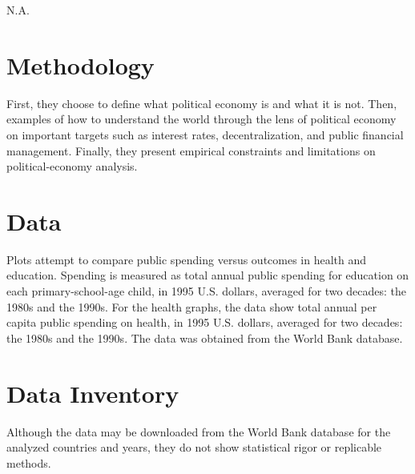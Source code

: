 \documentclass[9pt,twocolumn,twoside,]{pnas-new}
\begin{document}
N.A.

\hypertarget{methodology}{%
\section*{Methodology}\label{methodology}}

First, they choose to define what political economy is and what it is
not. Then, examples of how to understand the world through the lens of
political economy on important targets such as interest rates,
decentralization, and public financial management. Finally, they present
empirical constraints and limitations on political-economy analysis.

\hypertarget{data}{%
\section*{Data}\label{data}}

Plots attempt to compare public spending versus outcomes in health and
education. Spending is measured as total annual public spending for
education on each primary-school-age child, in 1995 U.S. dollars,
averaged for two decades: the 1980s and the 1990s. For the health
graphs, the data show total annual per capita public spending on health,
in 1995 U.S. dollars, averaged for two decades: the 1980s and the 1990s.
The data was obtained from the World Bank database.

\hypertarget{data-inventory}{%
\section*{Data Inventory}\label{data-inventory}}

Although the data may be downloaded from the World Bank database for the
analyzed countries and years, they do not show statistical rigor or
replicable methods.

\showmatmethods
\showacknow
\pnasbreak



% 
\end{document}
